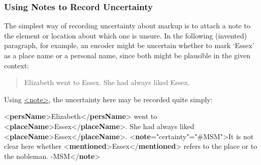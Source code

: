 \subsubsection[{Using Notes to Record Uncertainty}]{Using Notes to Record Uncertainty}\label{CECENO}\par
The simplest way of recording uncertainty about markup is to attach a note to the element or location about which one is unsure. In the following (invented) paragraph, for example, an encoder might be uncertain whether to mark ‘Essex’ as a place name or a personal name, since both might be plausible in the given context: 
\begin{quote}Elizabeth went to Essex. She had always liked Essex.\end{quote}
 Using \hyperref[TEI.note]{<note>}, the uncertainty here may be recorded quite simply: \par\bgroup{}\exampleFont \begin{shaded}\noindent\mbox{}{<\textbf{persName}>}Elizabeth{</\textbf{persName}>} went to {<\textbf{placeName}>}Essex{</\textbf{placeName}>}. She had always liked {<\textbf{placeName}>}Essex{</\textbf{placeName}>}.\mbox{}\newline 
{<\textbf{note}\hspace*{1em}{type}="{certainty}"\hspace*{1em}{resp}="{\#MSM}">}It is not\mbox{}\newline 
 clear here whether {<\textbf{mentioned}>}Essex{</\textbf{mentioned}>}\mbox{}\newline 
 refers to the place or to the nobleman. -MSM{</\textbf{note}>}\end{shaded}\egroup\par \par
